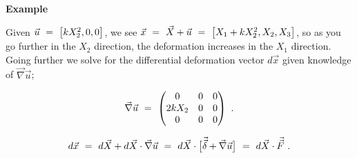 \documentclass{article}
\begin{document}
\textbf{Example}

Given \begin{math} \vec{u} \hspace{0.125cm} = \hspace{0.125cm} \big[ k X_{2}^{2} , 0 , 0 \big]  \end{math}, we see \begin{math} \vec{x} \hspace{0.125cm} = \hspace{0.125cm} \vec{X} + \vec{u}  \hspace{0.125cm} = \hspace{0.125cm} \big[ X_1 + k X_{2}^{2} , X_2 , X_3 \big]  \end{math}, so as you go further in the \begin{math} X_2  \end{math} direction, the deformation increases in the \begin{math} X_1 \end{math} direction. Going further we solve for the differential deformation vector \begin{math} d \vec{x} \end{math} given knowledge of \begin{math} \vec{\nabla} \vec{u} \end{math}; 

\begin{equation} \label{eq:1}
\vec{\nabla} \vec{u}  \hspace{0.125cm} =  \hspace{0.125cm}  \begin{pmatrix} 0 & 0 & 0 \\ 2 k X_2 & 0 & 0 \\ 0 & 0 & 0 \end{pmatrix}  \hspace{0.125cm} .
\end{equation} 

\begin{equation} \label{eq:1}
d \vec{x} \hspace{0.125cm} = \hspace{0.125cm} d \vec{X} + d \vec{X} \cdot \vec{\nabla} \vec{u}  \hspace{0.125cm} = \hspace{0.125cm} d \vec{X} \cdot \big[ \vec{\vec{\delta}} + \vec{\nabla} \vec{u} \big]  \hspace{0.125cm} = \hspace{0.125cm} d  \vec{X} \cdot \vec{\vec{F}} \hspace{0.125cm} .
\end{equation} 
\end{document}
